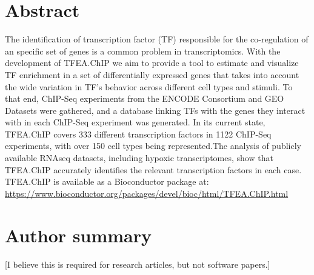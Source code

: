 \documentclass[10pt,letterpaper]{article}
\begin{document}
\section*{Abstract}
The identification of transcription factor (TF) responsible for the co-regulation of an specific set of genes is a common problem in transcriptomics. With the development of TFEA.ChIP we aim to provide a tool to estimate and visualize TF enrichment in a set of differentially expressed genes that takes into account the wide variation in TF's behavior across different cell types and stimuli. To that end, ChIP-Seq experiments from the ENCODE Consortium and GEO Datasets were gathered, and a database linking TFs with the genes they interact with in each ChIP-Seq experiment was generated. In its current state, TFEA.ChIP covers 333 different transcription factors in 1122 ChIP-Seq experiments, with over 150 cell types being represented.The analysis of publicly available RNAseq datasets, including hypoxic transcriptomes, show that TFEA.ChIP accurately identifies the relevant transcription factors in each case. TFEA.ChIP is available as a Bioconductor package at: \url{https://www.bioconductor.org/packages/devel/bioc/html/TFEA.ChIP.html} 


\section*{Author summary}
[I believe this is required for research articles, but not software papers.]
\linenumbers

\end{document}

